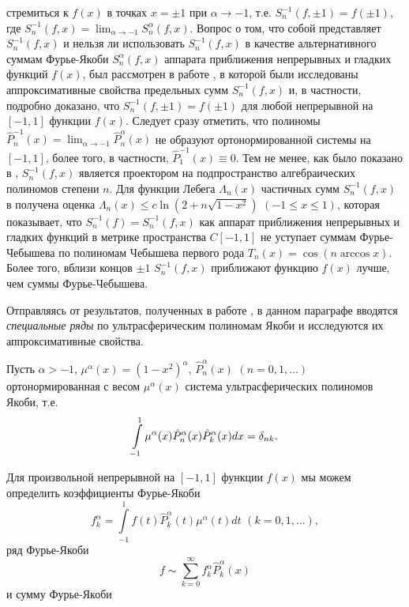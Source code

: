 стремиться к $f(x)$ в точках $x=\pm1$ при $\alpha\to -1$, т.е. $S_n^{-1}(f,\pm1)=f(\pm1)$,
 где $S_n^{-1}(f,x)=\lim_{\alpha\to-1}S_n^\alpha(f,x)$.
Вопрос о том, что собой представляет $S_n^{-1}(f,x)$ и нельзя ли использовать $S_n^{-1}(f,x)$ в качестве
 альтернативного суммам Фурье-Якоби $S_n^{\alpha}(f,x)$ аппарата приближения непрерывных и гладких функций
 $f(x)$, был рассмотрен в работе \cite{shii1}, в которой были  исследованы
аппроксимативные свойства предельных сумм $S_n^{-1}(f,x)$ и, в частности, подробно доказано, что $S_n^{-1}(f,\pm1)=f(\pm1)$ для любой непрерывной на $[-1,1]$ функции $f(x)$. Следует сразу отметить, что полиномы $\hat P_n^{-1}(x)=\lim_{\alpha\to-1}
\hat P_n^\alpha(x)$ не образуют ортонормированной системы на
$[-1,1]$, более того, в частности, $\hat
P_1^{-1}(x)\equiv0$. Тем не менее, как было  показано в \cite{shii1},
$S_n^{-1}(f,x)$ является проектором на подпространство
алгебраических полиномов степени $n$. Для функции Лебега
$\Lambda_n(x)$ частичных сумм $S_n^{-1}(f,x)$ в \cite{shii1} получена
оценка $\Lambda_n(x)\le c\ln(2+n\sqrt{1-x^2})$ $(-1\le x\le1)$,
которая показывает, что $S_n^{-1}(f)=S_n^{-1}(f,x)$ как аппарат
приближения непрерывных и гладких функций в метрике пространства
$C[-1,1]$ не уступает суммам Фурье-Чебышева по полиномам Чебышева
первого рода $T_n(x)=\cos(n\arccos x)$. Более того, вблизи концов $\pm 1$ $S_n^{-1}(f,x)$ приближают функцию $f(x)$
лучше, чем суммы  Фурье-Чебышева.

Отправляясь от результатов, полученных в работе \cite{shii1}, в данном параграфе вводятся {\em специальные ряды} по ультрасферическим полиномам Якоби и исследуются их аппроксимативные свойства.


Пусть $\alpha>-1$, $\mu^\alpha(x)=(1-x^2)^\alpha$,
$\hat P_n^\alpha(x)$ $(n=0,1,\ldots)$ ортонормированная с весом $\mu^\alpha(x)$ система ультрасферических полиномов
Якоби, т.е.
\begin{equation}\label{eq.1.2.4.1.1}
\int\limits\limits_{-1}^1\mu^\alpha(x)\hat P_n^{\alpha}(x)
\hat P_k^{\alpha}(x)dx=\delta_{nk}.
\end{equation}

Для произвольной непрерывной  на $[-1,1]$ функции $f(x)$ мы можем определить коэффициенты Фурье-Якоби
\begin{equation}\label{FYSerKoeffs}
f_k^\alpha=\int\limits_{-1}^1f(t)\hat
P_k^{\alpha}(t)\mu^{\alpha}(t)dt\,\, (k=0,1,\ldots),
\end{equation}
ряд Фурье-Якоби
\begin{equation}\label{eq.1.2.4.1.3}
f\sim \sum _{k=0}^\infty f_k^\alpha \hat P_k^\alpha(x)
\end{equation}
и сумму Фурье-Якоби

